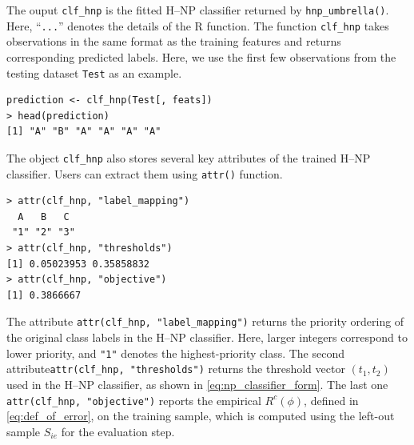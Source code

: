 The ouput \texttt{clf\_hnp} is the fitted H--NP classifier returned by \texttt{hnp\_umbrella()}. Here, ``\texttt{...}'' denotes the details of the R function. The function \texttt{clf\_hnp} takes observations in the same format as the
training features and returns corresponding predicted labels. Here, we use the first few observations from the testing dataset \texttt{Test} as an example.
\begin{verbatim}
prediction <- clf_hnp(Test[, feats])
> head(prediction)
[1] "A" "B" "A" "A" "A" "A"
\end{verbatim}
The object \texttt{clf\_hnp} also stores several key attributes of the trained H--NP classifier. Users can extract them using \texttt{attr()} function.
\begin{verbatim}
> attr(clf_hnp, "label_mapping")
  A   B   C 
 "1" "2" "3" 
> attr(clf_hnp, "thresholds")
[1] 0.05023953 0.35858832
> attr(clf_hnp, "objective")
[1] 0.3866667
\end{verbatim}
The attribute
\texttt{attr(clf\_hnp, "label\_mapping")} returns the priority ordering of the original class labels in the H--NP classifier. Here, larger integers correspond to lower priority, and \texttt{"1"} denotes the highest-priority class. The second attribute\texttt{attr(clf\_hnp, "thresholds")} returns the threshold vector \((t_1, t_2)\) used in the H--NP classifier, as shown in \eqref{eq:np_classifier_form}. The last one \texttt{attr(clf\_hnp, "objective")} reports the empirical \(R^c(\phi)\), defined in \eqref{eq:def_of_error}, on the training sample, which is computed using the left-out sample \(S_{ie}\) for the evaluation step.

